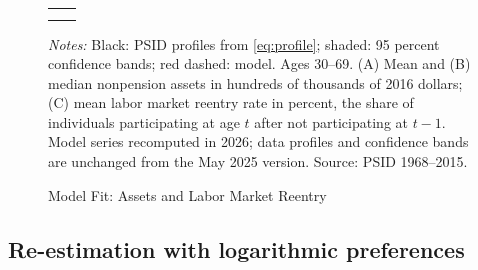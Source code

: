 \begin{figure}[!htbp]
\centering
\caption{Model Fit: Assets and Labor Market Reentry}
\label{fig:fitassets}
\vspace{6pt}
\begin{tabular}{cc}
 & \\[1.5ex]
\multicolumn{2}{c}{}
\end{tabular}
\begin{minipage}{0.95\textwidth}\footnotesize{}
\textit{Notes:} Black: PSID profiles from \eqref{eq:profile}; shaded: 95 percent confidence bands; red dashed: model. Ages 30--69. (A) Mean and (B) median nonpension assets in hundreds of thousands of 2016 dollars; (C) mean labor market reentry rate in percent, the share of individuals participating at age $t$ after not participating at $t-1$. Model series recomputed in 2026; data profiles and confidence bands are unchanged from the May 2025 version. Source: PSID 1968--2015.
\end{minipage}
\end{figure}

\subsection{Re-estimation with logarithmic preferences}\label{app:lnc}

